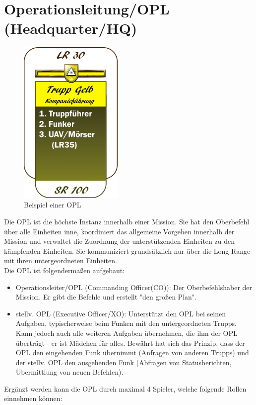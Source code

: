 \section{Operationsleitung/OPL (Headquarter/HQ)}
\begin{figure}[htbp]
	\includegraphics[width=50mm]{./img/truppenordnung/opl/opl.png}
	\caption{Beispiel einer OPL}
\end{figure}
Die OPL ist die höchste Instanz innerhalb einer Mission. Sie hat den Oberbefehl über alle Einheiten inne, koordiniert das allgemeine Vorgehen innerhalb der Mission und verwaltet die Zuordnung der unterstützenden Einheiten zu den kämpfenden Einheiten. Sie kommuniziert grundsätzlich nur über die Long-Range mit ihren untergeordneten Einheiten.\\
Die OPL ist folgendermaßen aufgebaut:
\begin{itemize}
	\item Operationsleiter/OPL (Commanding Officer(CO)): Der Oberbefehlshaber der Mission. Er gibt die Befehle und erstellt "den großen Plan".
	\item stellv. OPL (Executive Officer/XO): Unterstützt den OPL bei seinen Aufgaben, typischerweise beim Funken mit den untergeordneten Trupps. Kann jedoch auch alle weiteren Aufgaben übernehmen, die ihm der OPL überträgt - er ist Mädchen für alles. Bewährt hat sich das Prinzip, dass der OPL den eingehenden Funk übernimmt (Anfragen von anderen Trupps) und der stellv. OPL den ausgehenden Funk (Abfragen von Statusberichten, Übermittlung von neuen Befehlen).
\end{itemize}
Ergänzt werden kann die OPL durch maximal 4 Spieler, welche folgende Rollen einnehmen können:
